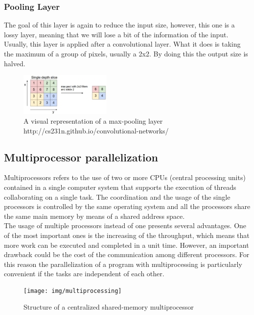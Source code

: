 \documentclass{article}
\begin{document}
{\subsubsection{Pooling Layer}
The goal of this layer is again to reduce the input size, however, this one is a lossy layer, meaning that we will lose a bit of the information of the input.
Usually, this layer is applied after a convolutional layer.
What it does is taking the maximum of a group of pixels, usually a 2x2. By doing this the output size is halved.
\begin{figure}[H]
	\centering
	\includegraphics[width=0.4\textwidth]{img/maxpool}
	\caption{A visual representation of a max-pooling layer http://cs231n.github.io/convolutional-networks/}
	\label{fig:4}
\end{figure}

\subsection{Multiprocessor parallelization}
Multiprocessors refers to the use of two or more CPUs (central processing units) contained in a single computer system that supports the execution of threads collaborating on a single task. The coordination and the usage of the single processors is controlled by the same operating system and all the processors share the same main memory by means of a shared address space.  \\
The usage of multiple processors instead of one presents several advantages. One of the most important ones is the increasing of the  throughput, which means that more work can be executed and completed in a unit time. However, an important drawback could be the cost of the communication among different processors. For this reason the parallelization of a program with multiprocessing is particularly convenient if the tasks are independent of each other.

\begin{figure}[h]
	\centering
	\texttt{[image: img/multiprocessing]}
	\caption{Structure of a centralized shared-memory multiprocessor}
	\label{fig:5}
\end{figure}



}
\end{document}
